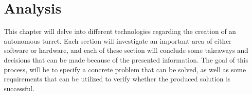 \chapter{Analysis}
This chapter will delve into different technologies regarding the creation of an autonomous turret. 
Each section will investigate an important area of either software or hardware, and each of these section will conclude some takeaways and decisions that can be made because of the presented information.
The goal of this process, will be to specify a concrete problem that can be solved, as well as some requirements that can be utilized to verify whether the produced solution is successful.








